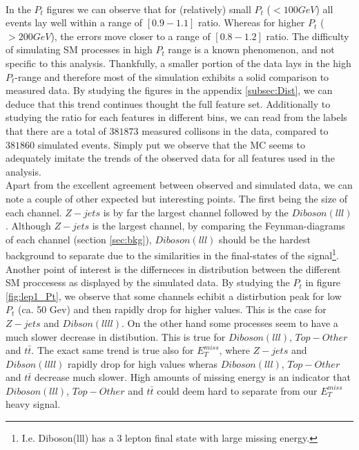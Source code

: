 \\
In the $P_t$ figures we can observe that for (relatively) small $P_t$ ($<100GeV$) all events lay well within a range of $[0.9-1.1]$ ratio. 
Whereas for higher $P_t$ ($>200GeV$), the errors move closer to a range of $[0.8-1.2]$ ratio. The difficulty of simulating \ac{SM} processes 
in high $P_t$ range is a known phenomenon, and not specific to this analysis. Thankfully, a smaller portion of the data lays in the high $P_t$-range
and therefore most of the simulation exhibits a solid comparison to measured data. By studying the figures in the appendix \ref{subsec:Dist}, 
we can deduce that this trend continues thought the full feature set. Additionally to studying the ratio for each features in different bins,
we can read from the labels that there are a total of $381873$ measured collisons in the data, compared to $381860$ simulated events.
Simply put we observe that the \ac{MC} seems to adequately imitate the trends of the observed data for all features used in the analysis. 
\\
Apart from the excellent agreement between observed and simulated data, we can note a couple of other expected
but interesting points. The first being the size of each channel. $Z-jets$ is by far the largest channel followed
by the $Diboson (lll)$. Although $Z-jets$ is the largest channel, by comparing the Feynman-diagrams of each channel
(section \ref{sec:bkg}), $Diboson(lll)$ should be the hardest background to separate due to the similarities in the 
final-states of the signal\footnote{I.e. Diboson(lll) has a 3 lepton final state with large missing energy.}. Another 
point of interest is the differneces in distribution between the different \ac{SM} proccesess as displayed by the 
simulated data. By studying the $P_t$ in figure \ref{fig:lep1_Pt}, we observe that some channels echibit a distirbution  
peak for low $P_t$ (ca. 50 Gev) and then rapidly drop for higher values. This is the case for $Z-jets$ and $Dibson (llll)$.
On the other hand some processes seem to have a much slower decrease in distibution. This is true for $Diboson(lll)$, $Top-Other$
and $t\bar{t}$. The exact same trend is true also for $E_T^{miss}$, where $Z-jets$ and $Dibson (llll)$ rapidly drop for high values 
wheras $Diboson(lll)$, $Top-Other$ and $t\bar{t}$ decrease much slower. High amounts of missing energy is an indicator that 
$Diboson(lll)$, $Top-Other$ and $t\bar{t}$  could deem hard to separate from our $E_T^{miss}$ heavy signal.
